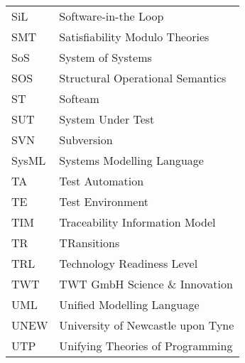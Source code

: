\begin{longtable}{ll}
SiL	& Software-in-the Loop\\
SMT & Satisfiability Modulo Theories \\
SoS     &System of Systems\\
SOS     &Structural Operational Semantics\\
ST      &Softeam\\
SUT     &System Under Test\\
SVN	&Subversion\\
SysML	&Systems Modelling Language\\
TA      &Test Automation\\
TE & Test Environment\\
TIM & Traceability Information Model\\
TR & TRansitions \\
TRL     &Technology Readiness Level\\
TWT & TWT GmbH Science \& Innovation\\
UML	&Unified Modelling Language\\
UNEW	&University of Newcastle upon Tyne\\
UTP     &Unifying Theories of Programming\\

\end{longtable}
